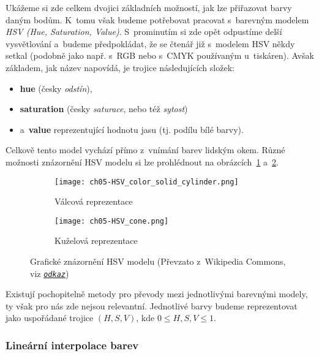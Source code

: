 Ukážeme si zde celkem dvojici základních možností, jak lze přiřazovat barvy daným bodům. K~tomu však budeme potřebovat pracovat s~barevným modelem \emph{HSV (Hue, Saturation, Value)}. S~prominutím si zde opět odpustíme delší vysvětlování a~budeme předpokládat, že se čtenář již s~modelem HSV někdy setkal (podobně jako např. s~RGB nebo s~CMYK používaným u~tiskáren). Avšak základem, jak název napovídá, je trojice následujících složek:
\begin{itemize}
    \item \textbf{hue} (česky \emph{odstín}),
    \item \textbf{saturation} (česky \emph{saturace}, nebo též \emph{sytost})
    \item a~\textbf{value} reprezentující hodnotu jasu (tj. podílu bílé barvy).
\end{itemize}
Celkově tento model vychází přímo z~vnímání barev lidským okem. Různé možnosti znázornění HSV modelu si lze prohlédnout na obrázcích~\ref{subfig:hsv-valcova-reprezentace} a~\ref{subfig:hsv-kuzelova-reprezentace}.
\begin{figure}[h]
    \centering
    \begin{subfigure}{0.45\textwidth}
        \centering
        \texttt{[image: ch05-HSV\_color\_solid\_cylinder.png]}
        \caption{Válcová reprezentace}
        \label{subfig:hsv-valcova-reprezentace}
    \end{subfigure}
    \qquad
    \begin{subfigure}{0.45\textwidth}
        \centering
        \texttt{[image: ch05-HSV\_cone.png]}
        \caption{Kuželová reprezentace}
        \label{subfig:hsv-kuzelova-reprezentace}
    \end{subfigure}
    \caption[Grafické znázornění HSV modelu]{Grafické znázornění HSV modelu (Převzato z~Wikipedia Commons, viz \href{https://cs.wikipedia.org/wiki/HSV}{\texttt{\textit{odkaz}}})}
    \label{fig:hsv}
\end{figure}

Existují pochopitelně metody pro převody mezi jednotlivými barevnými modely, ty však pro nás zde nejsou relevantní. Jednotlivé barvy budeme reprezentovat jako uspořádané trojice $(H,S,V)$, kde $0\leqslant H,S,V\leqslant 1$.

\subsubsection{Lineární interpolace barev}


